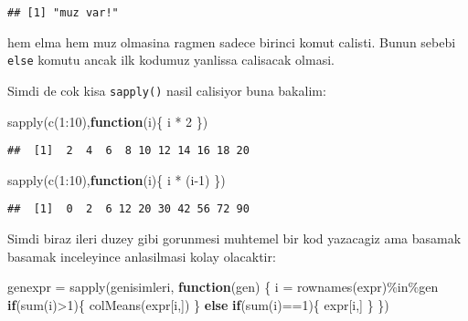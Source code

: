 \documentclass[
]{book}
\newenvironment{Shaded}{\begin{snugshade}}{\end{snugshade}}
\newcommand{\ControlFlowTok}[1]{\textcolor[rgb]{0.13,0.29,0.53}{\textbf{#1}}}
\newcommand{\DecValTok}[1]{\textcolor[rgb]{0.00,0.00,0.81}{#1}}
\newcommand{\FunctionTok}[1]{\textcolor[rgb]{0.00,0.00,0.00}{#1}}
\newcommand{\NormalTok}[1]{#1}
\newcommand{\OtherTok}[1]{\textcolor[rgb]{0.56,0.35,0.01}{#1}}
\newcommand{\SpecialCharTok}[1]{\textcolor[rgb]{0.00,0.00,0.00}{#1}}
\begin{document}
\begin{verbatim}
## [1] "muz var!"
\end{verbatim}

hem elma hem muz olmasina ragmen sadece birinci komut calisti. Bunun sebebi \texttt{else} komutu ancak ilk kodumuz yanlissa calisacak olmasi.

Simdi de cok kisa \texttt{sapply()} nasil calisiyor buna bakalim:

\begin{Shaded}
\begin{Highlighting}[]
\FunctionTok{sapply}\NormalTok{(}\FunctionTok{c}\NormalTok{(}\DecValTok{1}\SpecialCharTok{:}\DecValTok{10}\NormalTok{),}\ControlFlowTok{function}\NormalTok{(i)\{}
\NormalTok{  i }\SpecialCharTok{*} \DecValTok{2}
\NormalTok{\})}
\end{Highlighting}
\end{Shaded}

\begin{verbatim}
##  [1]  2  4  6  8 10 12 14 16 18 20
\end{verbatim}

\begin{Shaded}
\begin{Highlighting}[]
\FunctionTok{sapply}\NormalTok{(}\FunctionTok{c}\NormalTok{(}\DecValTok{1}\SpecialCharTok{:}\DecValTok{10}\NormalTok{),}\ControlFlowTok{function}\NormalTok{(i)\{}
\NormalTok{  i }\SpecialCharTok{*}\NormalTok{ (i}\DecValTok{{-}1}\NormalTok{)}
\NormalTok{\})}
\end{Highlighting}
\end{Shaded}

\begin{verbatim}
##  [1]  0  2  6 12 20 30 42 56 72 90
\end{verbatim}

Simdi biraz ileri duzey gibi gorunmesi muhtemel bir kod yazacagiz ama basamak basamak inceleyince anlasilmasi kolay olacaktir:

\begin{Shaded}
\begin{Highlighting}[]
\NormalTok{genexpr }\OtherTok{=} \FunctionTok{sapply}\NormalTok{(genisimleri, }\ControlFlowTok{function}\NormalTok{(gen) \{}
\NormalTok{  i }\OtherTok{=} \FunctionTok{rownames}\NormalTok{(expr)}\SpecialCharTok{\%in\%}\NormalTok{gen}
  \ControlFlowTok{if}\NormalTok{(}\FunctionTok{sum}\NormalTok{(i)}\SpecialCharTok{\textgreater{}}\DecValTok{1}\NormalTok{)\{}
    \FunctionTok{colMeans}\NormalTok{(expr[i,])}
\NormalTok{  \} }\ControlFlowTok{else} \ControlFlowTok{if}\NormalTok{(}\FunctionTok{sum}\NormalTok{(i)}\SpecialCharTok{==}\DecValTok{1}\NormalTok{)\{}
\NormalTok{    expr[i,]}
\NormalTok{  \}}
\NormalTok{\})}
\end{Highlighting}
\end{Shaded}
\end{document}

